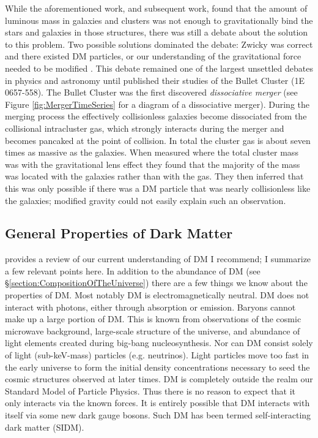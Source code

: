 While the aforementioned work, and subsequent work, found that the amount of luminous mass in galaxies and clusters was not enough to gravitationally bind the stars and galaxies in those structures, there was still a debate about the solution to this problem. 
Two possible solutions dominated the debate: Zwicky was correct and there existed DM particles, or our understanding of the gravitational force needed to be modified \citep[see][for a review]{Sanders:2002cc}.
This debate remained one of the largest unsettled debates in physics and astronomy until \citet{Clowe:2004eq} published their studies of the Bullet Cluster (1E 0657-558).
The Bullet Cluster was the first discovered \textit{dissociative merger} (see Figure \ref{fig:MergerTimeSeries} for a diagram of a dissociative merger).
During the merging process the effectively collisionless galaxies  become dissociated from the collisional intracluster gas, which strongly interacts during the merger and becomes pancaked at the point of collision.
In total the cluster gas is about seven times as massive as the galaxies.
When \citet{Clowe:2004eq} measured where the total cluster mass was with the gravitational lens effect they found that the majority of the mass was located with the galaxies rather than with the gas.
They then inferred that this was only possible if there was a DM particle that was nearly collisionless like the galaxies; modified gravity could not easily explain such an observation.

\subsection{General Properties of Dark Matter}

\citet{Peter:2012tg} provides a review of our current understanding of DM I recommend;  I summarize a few relevant points here.
In addition to the abundance of DM (see \S \ref{section:CompositionOfTheUniverse}) there are a few things we know about the properties of DM.
Most notably DM is electromagnetically neutral.
DM does not interact with photons, either through absorption or emission.
Baryons cannot make up a large portion of DM.
This is known from observations of the cosmic microwave background, large-scale structure of the universe, and abundance of light elements created during big-bang nucleosynthesis.
Nor can DM consist solely of light (sub-keV-mass) particles (e.g. neutrinos). 
Light particles move too fast in the early universe to form the initial density concentrations necessary to seed the cosmic structures observed at later times.
DM is completely outside the realm our Standard Model of Particle Physics.
Thus there is no reason to expect that it only interacts via the known forces.
It is entirely possible that DM interacts with itself via some new dark gauge bosons.
Such DM has been termed self-interacting dark matter (SIDM).

